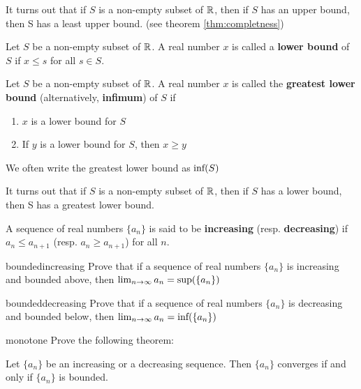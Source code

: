 It turns out that if $S$ is a non-empty subset of $\mathbb{R}$, then if $S$ has an upper bound, then S has a least upper bound. (see theorem \cref{thm:completness})

\begin{definition}
Let $S$ be a non-empty subset of $\mathbb{R}$.  A real number $x$ is called a \textbf{lower bound} of $S$ if $x \leq s$ for all $s \in S$.
\end{definition}

\begin{definition}
Let $S$ be a non-empty subset of $\mathbb{R}$.  A real number $x$ is called the \textbf{greatest lower bound} (alternatively, \textbf{infimum}) of $S$ if
\begin{enumerate}
    \item $x$ is a lower bound for $S$
    \item If $y$ is a lower bound for $S$, then $x \geq y$
\end{enumerate}

We often write the greatest lower  bound as $\textnormal{inf}(S)$
\end{definition}

It turns out that if $S$ is a non-empty subset of $\mathbb{R}$, then if $S$ has a lower bound, then S has a greatest lower bound.


\begin{definition}
    A sequence of real numbers $\{a_n\}$ is said to be \textbf{increasing} (resp. \textbf{decreasing}) if $a_n \leq a_{n+1}$ (resp. $a_n \geq a_{n+1}$) for all $n$.
    \end{definition}
    
\begin{problem}{boundedincreasing}
Prove that if a sequence of real numbers $\{a_n\}$ is increasing and bounded above, then $\lim_{n \to \infty} a_n = \textnormal{sup}(\{a_n\})$
\end{problem}

\begin{problem}{boundeddecreasing}
Prove that if a sequence of real numbers $\{a_n\}$ is decreasing and bounded below, then $\lim_{n \to \infty} a_n = \textnormal{inf}(\{a_n\})$
\end{problem}


\begin{problem}{monotone}
Prove the following theorem:

Let $\{a_n\}$ be an increasing or a decreasing sequence.  Then $\{a_n\}$ converges if and only if $\{a_n\}$ is bounded.
\end{problem}

